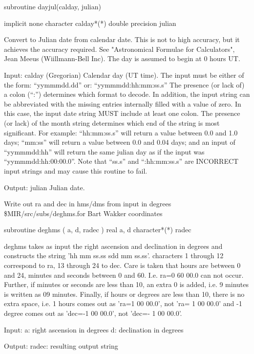 \par{\tenpoint
{\eightpoint\begintt
      subroutine dayjul(calday, julian)

      implicit none
      character calday*(*)
      double precision julian

  Convert to Julian date from calendar date. This is not to high
  accuracy, but it achieves the accuracy required. See "Astronomical
  Formulae for Calculators", Jean Meeus (Wiillmann-Bell Inc).
  The day is assumed to begin at 0 hours UT.

  Input:
    calday   (Gregorian) Calendar day (UT time).
             The input must be either of the form:
                     ``yymmmdd.dd''
             or:
                     ``yymmmdd:hh:mm:ss.s''
             The presence (or lack of) a colon (``:'') determines
             which format to decode.  In addition, the input string
             can be abbreviated with the missing entries internally
             filled with a value of zero.  In this case, the input
             date string MUST include at least one colon.  The
             presence (or lack) of the month string determines
             which end of the string is most significant.  For
             example: ``hh:mm:ss.s'' will return a value between
             0.0 and 1.0 days; ``mm:ss'' will return a value
             between 0.0 and 0.04 days; and an input of ``yymmmdd:hh''
             will return the same julian day as if the input was
             ``yymmmdd:hh:00:00.0''.
             Note that ``ss.s'' and ``:hh:mm:ss.s'' are INCORRECT
             input strings and may cause this routine to fail.

  Output:
    julian   Julian date.
\endtt}
\par}
%
\noindent Write out ra and dec in hms/dms from input in degrees
\newline \ 
\newline {} \$MIR/src/subs/deghms.for
\newline {} Bart Wakker
\newline {} coordinates
\par{\tenpoint
{\eightpoint\begintt
      subroutine deghms ( a, d, radec )
      real          a, d
      character*(*) radec

 deghms takes as input the right ascension and declination in degrees and
 constructs the string 'hh mm ss.ss sdd mm ss.ss'.
 characters 1 through 12 correspond to ra, 13 through 24 to dec.
 Care is taken that hours are between 0 and 24, minutes and seconds between
 0 and 60. I.e. ra=0 60 00.0 can not occur.
 Further, if minutes or seconds are less than 10, an extra 0 is added, i.e.
 9 minutes is written as 09 minutes.
 Finally, if hours or degrees are less than 10, there is no extra space, i.e.
 1 hours comes out as 'ra=1 00 00.0', not 'ra= 1 00 00.0' and -1 degree comes
 out as 'dec=-1 00 00.0', not 'dec=- 1 00 00.0'.

 Input:
   a:     right ascension in degrees
   d:     declination in degrees

 Output:
   radec: resulting output string
\endtt}
\par}
